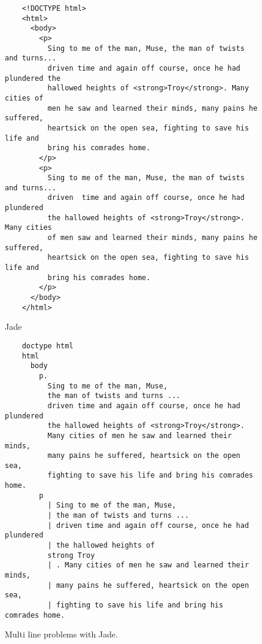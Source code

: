 \begin{figure}[ht!]
    \large{}\normalsize{}
    \begin{verbatim}
    <!DOCTYPE html>
    <html>
      <body>
        <p>
          Sing to me of the man, Muse, the man of twists and turns... 
          driven time and again off course, once he had plundered the
          hallowed heights of <strong>Troy</strong>. Many cities of 
          men he saw and learned their minds, many pains he suffered, 
          heartsick on the open sea, fighting to save his life and 
          bring his comrades home.
        </p>
        <p>
          Sing to me of the man, Muse, the man of twists and turns... 
          driven  time and again off course, once he had plundered
          the hallowed heights of <strong>Troy</strong>. Many cities
          of men saw and learned their minds, many pains he suffered, 
          heartsick on the open sea, fighting to save his life and 
          bring his comrades home.
        </p>
      </body>
    </html>
    \end{verbatim}
    \newpage
    \large{Jade}\normalsize{}
    \begin{verbatim}
    doctype html
    html
      body
        p.
          Sing to me of the man, Muse, 
          the man of twists and turns ... 
          driven time and again off course, once he had plundered 
          the hallowed heights of <strong>Troy</strong>. 
          Many cities of men he saw and learned their minds, 
          many pains he suffered, heartsick on the open sea, 
          fighting to save his life and bring his comrades home. 
        p
          | Sing to me of the man, Muse, 
          | the man of twists and turns ... 
          | driven time and again off course, once he had plundered 
          | the hallowed heights of 
          strong Troy 
          | . Many cities of men he saw and learned their minds, 
          | many pains he suffered, heartsick on the open sea, 
          | fighting to save his life and bring his comrades home. 
    \end{verbatim}
    \caption{Multi line problems with Jade.}
    \label{fig:JadeMultiLine}
\end{figure}

